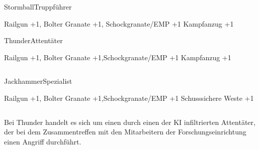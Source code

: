 \begin{column}[l]{0.45}
    \begin{nscsheet}[h]{Stormball\newline{}Truppführer}
        \nscstats[ATT=3,AGG=3,CON=2]
        \nscruler
        \begin{nscinventory}
            \nscitem[Waffen] Railgun +1, Bolter
            \nscitem[Granaten] Granate +1, Schockgranate/EMP +1
            \nscitem[Rüstung] Kampfanzug +1
        \end{nscinventory}
    \end{nscsheet}

    \begin{nscsheet}[h]{Thunder\newline{}Attentäter}
        \nscstats[ATT=3,AGG=3,CON=2]
        \nscruler
        \begin{nscinventory}
            \nscitem[Waffen] Railgun +1, Bolter
            \nscitem[Granaten] Granate +1,\newline{}Schockgranate/EMP +1
            \nscitem[Rüstung] Kampfanzug +1
        \end{nscinventory}
    \end{nscsheet}
\end{column}
\begin{column}[r]{0.45}
    \begin{nscsheet}[h]{Jackhammer\newline{}Spezialist}
        \nscstats[ATT=2,AGG=2,DEX=3,CON=2]
        \nscruler
        \begin{nscinventory}
            \nscitem[Waffen] Railgun +1, Bolter
            \nscitem[Granaten] Granate +1,\newline{}Schockgranate/EMP +1
            \nscitem[Rüstung] Schusssichere Weste +1
        \end{nscinventory}
    \end{nscsheet}
\end{column}

\medskip
Bei Thunder handelt es sich um einen durch einen der KI infiltrierten Attentäter, der bei dem Zusammentreffen mit den 
Mitarbeitern der Forschungseinrichtung einen Angriff durchführt.
